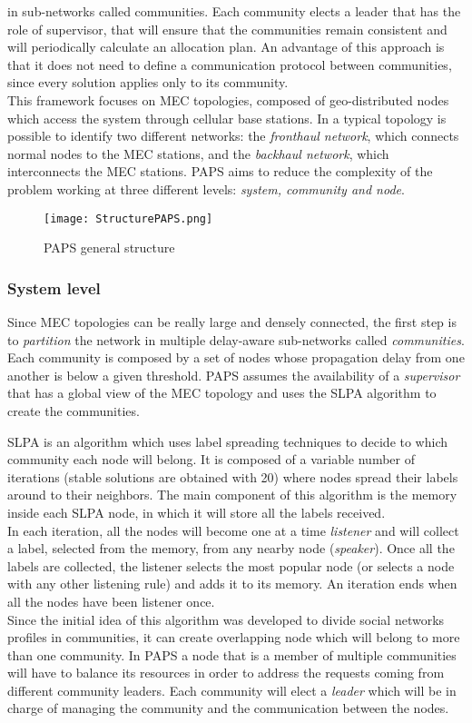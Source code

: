 in sub-networks called communities. Each community elects a leader that has the role of supervisor, that
will ensure that the communities remain consistent and will periodically calculate an allocation plan.
An advantage of this approach is that it does not need to define a communication protocol between communities,
since every solution applies only to its community.
\\
This framework focuses on MEC topologies, composed of geo-distributed nodes which access
the system through cellular base stations. In a typical topology is possible to identify
two different networks: the \textit{fronthaul network}, which connects normal nodes to 
the MEC stations, and the \textit{backhaul network}, which interconnects the MEC stations.
PAPS aims to reduce the complexity of the problem working at three different levels: 
\textit{system, community and node}. 
\\
\begin{figure}[h]
    \texttt{[image: StructurePAPS.png]}
    \label{fig:structure}
    \caption{PAPS general structure}
\end{figure}

\subsubsection*{System level}
Since MEC topologies can be really large and densely connected, the first step is to \textit{partition}
the network in multiple delay-aware sub-networks called \textit{communities}. Each community
is composed by a set of nodes whose propagation delay from one another is below a given 
threshold. PAPS assumes the availability of a \textit{supervisor} that has a global view of
the MEC topology and uses the SLPA \cite{SLPA} algorithm to create the communities.
\par
SLPA is an algorithm which uses label spreading techniques to decide to which community each node will belong.
It is composed of a variable number of iterations (stable solutions are obtained with 20) where nodes spread their labels 
around to their neighbors.
The main component of this  algorithm is the memory inside each SLPA node, in which it will store all the labels received.
\\
In each iteration, all the nodes will become one at a time 
\textit{listener} and will collect a label, selected from the memory, from any nearby 
node (\textit{speaker}). Once all the labels are collected, the listener selects the 
most popular node (or selects a node with any other listening rule) and adds it to its
memory.
An iteration ends when all the nodes have been listener once. \\
Since the initial idea of this 
algorithm was developed to divide social networks profiles in communities, it can create 
overlapping node which will belong to more than one community. 
In PAPS a node that is a member of multiple communities will have to balance its resources in order to address
the requests coming from different community leaders.
Each community will
elect a \textit{leader} which will be in charge of managing the community and the communication
between the nodes.

